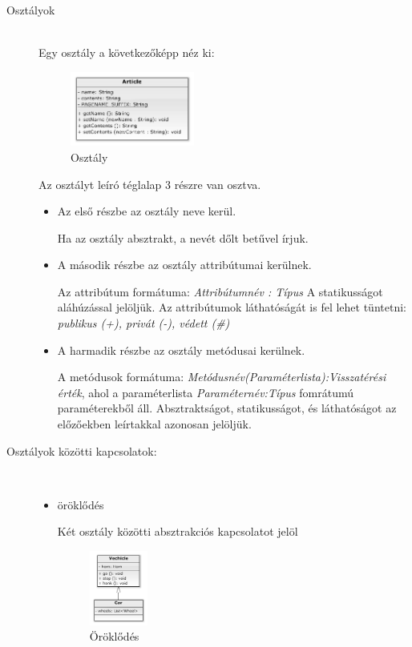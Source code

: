 \documentclass[margin=0px]{article}
\begin{document}
			\begin{description}
				\item[Osztályok] \hfill \\
				
				Egy osztály a következőképp néz ki:
				\begin{figure}[H]
					\centering
					\includegraphics[width=0.4\textwidth]{img/osztaly.png}
					\caption{Osztály}
				\end{figure}
				
				Az osztályt leíró téglalap 3 részre van osztva.
					\begin{itemize}
						\item Az első részbe az osztály neve kerül.
						
						Ha az osztály absztrakt, a nevét dőlt betűvel írjuk.
						
						\item A második részbe az osztály attribútumai kerülnek.
						
						Az attribútum formátuma: \textit{Attribútumnév : Típus}
						A statikusságot aláhúzással jelöljük.
						Az attribútumok láthatóságát is fel lehet tüntetni: \textit{ publikus (+), privát (-), védett (\#)}
						
						\item A harmadik részbe az osztály metódusai kerülnek.
						
						A metódusok formátuma: \textit{Metódusnév(Paraméterlista):Visszatérési érték}, ahol a paraméterlista \textit{Paraméternév:Típus} fomrátumú paraméterekből áll.
						Absztraktságot, statikusságot, és láthatóságot az előzőekben leírtakkal azonosan jelöljük.
 					\end{itemize}
 				\item[Osztályok közötti kapcsolatok:] \hfill \\
 					
 					\begin{itemize}
 						\item öröklődés
	 						
	 						Két osztály közötti absztrakciós kapcsolatot jelöl
	 						\begin{figure}[H]
	 							\centering
	 							\includegraphics[width=0.2\textwidth]{img/oroklodes.png}
	 							\caption{Öröklődés}
	 						\end{figure}
	 						

\end{itemize}
\end{description}
\end{document}
